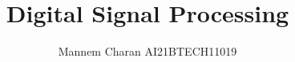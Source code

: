 \documentclass[journal,12pt,twocolumn]{IEEEtran}
\begin{document}
\let\StandardTheFigure\thefigure
\renewcommand{\thefigure}{\theproblem}



\def\putbox#1#2#3{\makebox[0in][l]{\makebox[#1][l]{}\raisebox{\baselineskip}[0in][0in]{\raisebox{#2}[0in][0in]{#3}}}}
     \def\rightbox#1{\makebox[0in][r]{#1}}
     \def\centbox#1{\makebox[0in]{#1}}
     \def\topbox#1{\raisebox{-\baselineskip}[0in][0in]{#1}}
     \def\midbox#1{\raisebox{-0.5\baselineskip}[0in][0in]{#1}}

\vspace{3cm}

\title{ 
Digital Signal Processing
}


%
%
%

\author{ Mannem Charan AI21BTECH11019}
% 
%
\end{document}
